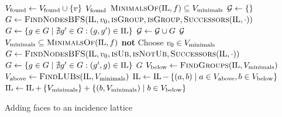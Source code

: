 \begin{algorithm}[tbp]
\begin{algorithmic}[1]
                    \State $V_{\textnormal{found}} \gets V_{\textnormal{found}} \cup \left\{ v \right\}$
                \EndIf
            \EndWhile
            \State \Return $V_{\textnormal{found}}$
        \EndFunction
        \Statex
                \State \Return $\Call{MinimalsOf}{\IL, f} \subseteq V_{\textnormal{minimals}}$
            \EndFunction
            \State $\mathcal{G} \gets \left\{  \right\}$
                \State $G \gets \Call{FindNodesBFS}{\IL, v_0, \pred{isGroup}, \pred{isGroup}, \pred{Successors}(\IL, \cdot)}$
                \State $G \gets \left\{ g \in G \mid \nexists g^\prime \in G : (g, g^\prime) \in \operatorname{IL} \right\}$
                \State $\mathcal{G} \gets \mathcal{G} \cup G$
            \EndFor
            \State \Return $\mathcal{G}$
        \EndFunction
        \Statex
                \State \Return $V_{\textnormal{minimals}} \subseteq \Call{MinimalsOf}{\IL, f}$
            \EndFunction
                \State \Return \textbf{not} 
            \EndFunction
            \State Choose $v_0 \in V_{\textnormal{minimals}}$
            \State $G \gets \Call{FindNodesBFS}{\IL, v_0, \pred{isUb}, \pred{isNotUb}, \pred{Successors}(\IL, \cdot)}$
            \State $G \gets \left\{ g \in G \mid \nexists g^\prime \in G : (g^\prime, g) \in \operatorname{IL} \right\}$
            \State \Return $G$
        \EndFunction
        \Statex
            \State $V_{\textnormal{below}} \gets \Call{FindGroups}{\IL, V_{\textnormal{minimals}}}$
            \State $V_{\textnormal{above}} \gets \Call{FindLUBs}{\IL, V_{\textnormal{minimals}}}$
            \State $\operatorname{IL} \gets \operatorname{IL} - \left\{ (a, b) \mid a \in V_{\textnormal{above}}, b \in V_{\textnormal{below}} \right\}$
            \State $\operatorname{IL} \gets \operatorname{IL} + \left\{ V_{\textnormal{minimals}} \right\} + \left\{ (b, V_{\textnormal{minimals}}) \mid b \in V_{\textnormal{below}} \right\}$
        \EndProcedure
    \end{algorithmic}
    \caption{Adding faces to an incidence lattice}
    \label{alg:addface}
\end{algorithm}
